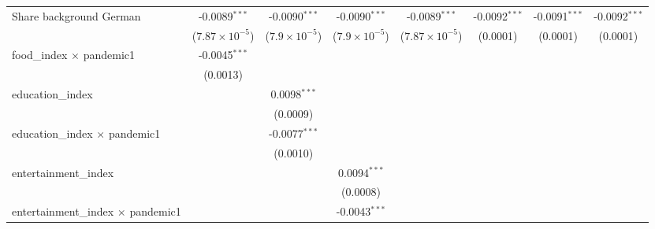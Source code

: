 \begin{table}[htbp]
\begin{threeparttable}[b]
\begin{tabular}{lccccccc}
         Share background German                    & -0.0089$^{***}$         & -0.0090$^{***}$        & -0.0090$^{***}$        & -0.0089$^{***}$         & -0.0092$^{***}$ & -0.0091$^{***}$ & -0.0092$^{***}$\\   
                                                    & ($7.87\times 10^{-5}$)  & ($7.9\times 10^{-5}$)  & ($7.9\times 10^{-5}$)  & ($7.87\times 10^{-5}$)  & (0.0001)        & (0.0001)        & (0.0001)\\   
         food\_index $\times$ pandemic1             & -0.0045$^{***}$         &                        &                        &                         &                 &                 &   \\   
                                                    & (0.0013)                &                        &                        &                         &                 &                 &   \\   
         education\_index                           &                         & 0.0098$^{***}$         &                        &                         &                 &                 &   \\   
                                                    &                         & (0.0009)               &                        &                         &                 &                 &   \\   
         education\_index $\times$ pandemic1        &                         & -0.0077$^{***}$        &                        &                         &                 &                 &   \\   
                                                    &                         & (0.0010)               &                        &                         &                 &                 &   \\   
         entertainment\_index                       &                         &                        & 0.0094$^{***}$         &                         &                 &                 &   \\   
                                                    &                         &                        & (0.0008)               &                         &                 &                 &   \\   
         entertainment\_index $\times$ pandemic1    &                         &                        & -0.0043$^{***}$        &                         &                 &                 &   \\   

\end{tabular}
\end{threeparttable}
\end{table}
